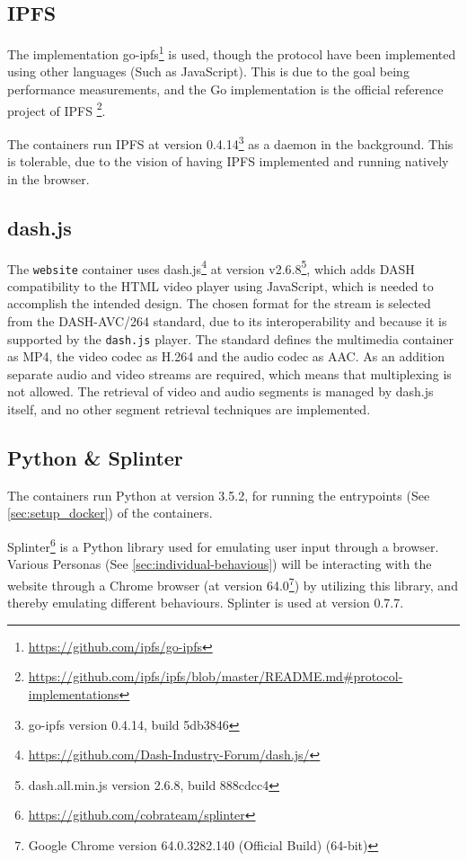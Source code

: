 \subsection{IPFS}
\label{sec:setup_ipfs}
The implementation go-ipfs\footnote{\url{https://github.com/ipfs/go-ipfs}} is used, though the protocol have been implemented using other languages (Such as JavaScript). 
This is due to the goal being performance measurements, and the Go implementation is the official reference project of \ac{IPFS} \footnote{\url{https://github.com/ipfs/ipfs/blob/master/README.md\#protocol-implementations}}.

The containers run \ac{IPFS} at version 0.4.14\footnote{go-ipfs version 0.4.14, build 5db3846} as a daemon in the background. This is tolerable, due to the vision of having \ac{IPFS} implemented and running natively in the browser.


\subsection{dash.js}
\label{sec:setup_dash.js}
The \texttt{website} container uses dash.js\footnote{\url{https://github.com/Dash-Industry-Forum/dash.js/}} at version v2.6.8\footnote{dash.all.min.js version 2.6.8, build 888cdcc4}, which adds \ac{DASH} compatibility to the \ac{HTML} video player using JavaScript, which is needed to accomplish the intended design.
The chosen format for the stream is selected from the DASH-AVC/264 standard\cite{dash264}, due to its interoperability and because it is supported by the \texttt{dash.js} player.
The standard defines the multimedia container as MP4, the video codec as H.264 and the audio codec as AAC. As an addition separate audio and video streams are required, which means that multiplexing is not allowed.
The retrieval of video and audio segments is managed by dash.js itself, and no other segment retrieval techniques are implemented.

\subsection{Python \& Splinter}
\label{sec:setup_python}
\label{sec:setup_splinter}
The containers run Python at version 3.5.2, for running the entrypoints (See \autoref{sec:setup_docker}) of the containers.

Splinter\footnote{\url{https://github.com/cobrateam/splinter}} is a Python library used for emulating user input through a browser. Various Personas (See \autoref{sec:individual-behavious}) will be interacting with the website through a Chrome browser (at version 64.0\footnote{Google Chrome version 64.0.3282.140 (Official Build) (64-bit)}) by utilizing this library, and thereby emulating different behaviours.
Splinter is used at version 0.7.7.


